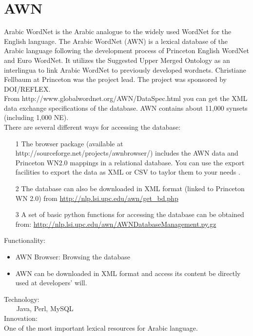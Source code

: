 \section{AWN}
Arabic WordNet is the Arabic analogue to the widely used WordNet for the English language. The Arabic WordNet (AWN) is a lexical database of the Arabic language following the development process of Princeton English WordNet and Euro WordNet. It utilizes the Suggested Upper Merged Ontology as an interlingua to link Arabic WordNet to previously developed wordnets. Christiane Fellbaum at Princeton was the project lead. The project was sponsored by DOI/REFLEX.\\
From http://www.globalwordnet.org/AWN/DataSpec.html you can get the XML data exchange specifications of the database. AWN contains about 11,000 synsets (including 1,000 NE).\\

There are several different ways for accessing the database:\\
\begin{itemize}
\item[1] The browser package (available at http://sourceforge.net/projects/awnbrowser/) includes the AWN data and Princeton WN2.0 mappings in a relational database. You can use the export facilities to export the data as XML or CSV to taylor them to your needs .\\
\item[2] The database can also be downloaded in XML format (linked to Princeton WN 2.0) from \url {http://nlp.lsi.upc.edu/awn/get_bd.php}\\
\item[3] A set of basic python functions for accessing the database can be obtained from: \url {http://nlp.lsi.upc.edu/awn/AWNDatabaseManagement.py.gz}\\
\end{itemize}
Functionality:\\
\begin{itemize}
\item AWN Browser: Browsing the database\\
\item AWN can be downloaded in XML format and access its content be directly used at developers' will.\\
\end{itemize}
Technology:\\
    Java, Perl, MySQL\\
Innovation:\\
	One of the most important lexical resources for Arabic language.\\


